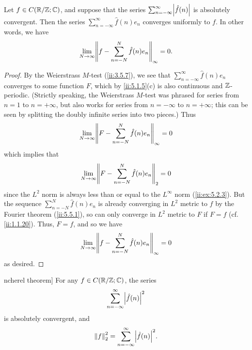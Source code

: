 \begin{thm}\label{ii:5.5.3}
  Let \(f \in C(\mathbb{R} / \mathbb{Z} ; \mathbb{C})\), and suppose that the series \(\sum_{n = -\infty}^\infty \abs{\hat{f}(n)}\) is absolutely convergent.
  Then the series \(\sum_{n = -\infty}^\infty \hat{f}(n) e_n\) converges uniformly to \(f\).
  In other words, we have
  \[
    \lim_{N \to \infty} \norm*{f - \sum_{n = -N}^N \hat{f}(n) e_n}_{\infty} = 0.
  \]
\end{thm}

\begin{proof}
  By the Weierstrass \(M\)-test (\cref{ii:3.5.7}), we see that \(\sum_{n = -\infty}^\infty \hat{f}(n) e_n\) converges to some function \(F\), which by \cref{ii:5.1.5}(c) is also continuous and \(\mathbb{Z}\)-periodic.
  (Strictly speaking, the Weierstrass \(M\)-test was phrased for series from \(n = 1\) to \(n = +\infty\), but also works for series from \(n = -\infty\) to \(n = +\infty\);
  this can be seen by splitting the doubly infinite series into two pieces.)
  Thus
  \[
    \lim_{N \to \infty} \norm*{F - \sum_{n = -N}^N \hat{f}(n) e_n}_{\infty} = 0
  \]
  which implies that
  \[
    \lim_{N \to \infty} \norm*{F - \sum_{n = -N}^N \hat{f}(n) e_n}_2 = 0
  \]
  since the \(L^2\) norm is always less than or equal to the \(L^\infty\) norm (\cref{ii:ex:5.2.3}).
  But the sequence \(\sum_{n = -N}^N \hat{f}(n) e_n\) is already converging in \(L^2\) metric to \(f\) by the Fourier theorem (\cref{ii:5.5.1}), so can only converge in \(L^2\) metric to \(F\) if \(F = f\)
  (cf. \cref{ii:1.1.20}).
  Thus, \(F = f\), and so we have
  \[
    \lim_{N \to \infty} \norm*{f - \sum_{n = -N}^N \hat{f}(n) e_n}_{\infty} = 0
  \]
  as desired.
\end{proof}

\begin{thm}ncherel theorem]\label{ii:5.5.4}
  For any \(f \in C(\mathbb{R} / \mathbb{Z} ; \mathbb{C})\), the series
  \[
    \sum_{n = -\infty}^\infty \abs{\hat{f}(n)}^2
  \]
  is absolutely convergent, and
  \[
    \norm*{f}_2^2 = \sum_{n = -\infty}^\infty \abs{\hat{f}(n)}^2.
  \]
\end{thm}

